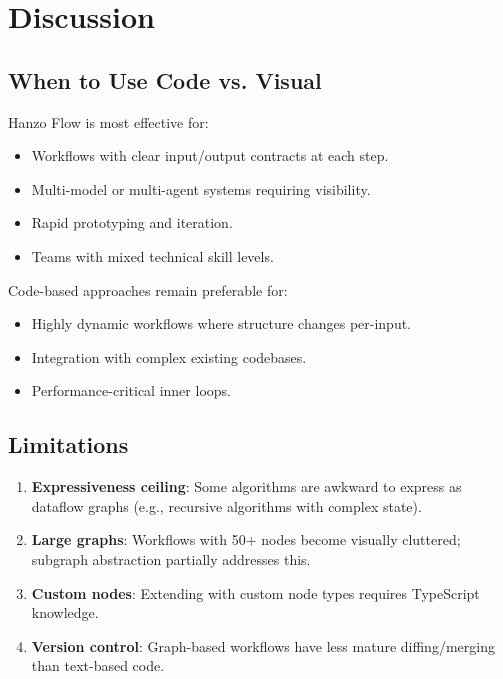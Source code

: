 \section{Discussion}

\label{sec:discussion}

\subsection{When to Use Code vs. Visual}

Hanzo Flow is most effective for:
\begin{itemize}[leftmargin=1.1em]
    \item Workflows with clear input/output contracts at each step.
    \item Multi-model or multi-agent systems requiring visibility.
    \item Rapid prototyping and iteration.
    \item Teams with mixed technical skill levels.
\end{itemize}

Code-based approaches remain preferable for:
\begin{itemize}[leftmargin=1.1em]
    \item Highly dynamic workflows where structure changes per-input.
    \item Integration with complex existing codebases.
    \item Performance-critical inner loops.
\end{itemize}

\subsection{Limitations}

\begin{enumerate}[leftmargin=1.4em]
    \item \textbf{Expressiveness ceiling}: Some algorithms are awkward to express as dataflow graphs (e.g., recursive algorithms with complex state).
    \item \textbf{Large graphs}: Workflows with 50+ nodes become visually cluttered; subgraph abstraction partially addresses this.
    \item \textbf{Custom nodes}: Extending with custom node types requires TypeScript knowledge.
    \item \textbf{Version control}: Graph-based workflows have less mature diffing/merging than text-based code.
\end{enumerate}

